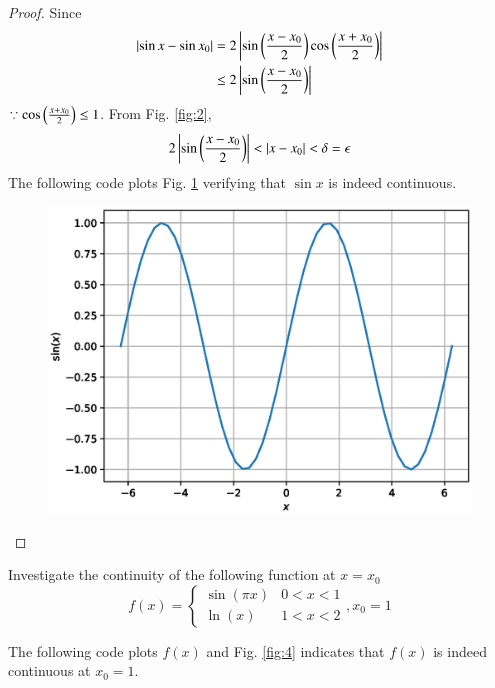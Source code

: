 \documentclass[journal,12pt,twocolumn]{IEEEtran}
\begin{document}
\begin{proof}
Since
\begin{align}
\left\vert\sin x - \sin x_0\right\vert &= 2\left\vert\sin\left(\frac{x-x_0}{2}\right)\cos\left(\frac{x+x_0}{2}\right)\right\vert
\\
&\leq 2\left\vert\sin\left(\frac{x-x_0}{2}\right)\right\vert 
\end{align}
$\because \cos\left(\frac{x+x_0}{2}\right) \le 1$. From Fig. \ref{fig:2},
\begin{align}
2\left\vert\sin\left(\frac{x-x_0}{2}\right)\right\vert < \left\vert x-x_0\right\vert < \delta = \epsilon
\end{align}
The following code plots  Fig. \ref{fig:2.1} verifying that $\sin x$ is indeed continuous.

%
\begin{figure}[!ht]
\begin{center}
\includegraphics[width=\columnwidth]{./figs/2_1.eps}
\end{center}
\label{fig:2.1}	
\end{figure}

\end{proof}
\begin{problem}
Investigate the continuity of the following function at $x=x_0$
%
\begin{equation}
f(x)=
 \begin{cases} 
      \sin(\pi x) & 0<x < 1 \\
      \ln (x) & 1< x< 2  
   \end{cases},x_0=1
\end{equation}
\end{problem}
%
\solution The following code plots $f(x)$ and  
Fig. \ref{fig:4} indicates that $f(x)$ is indeed continuous at $x_0=1$.
\end{document}

